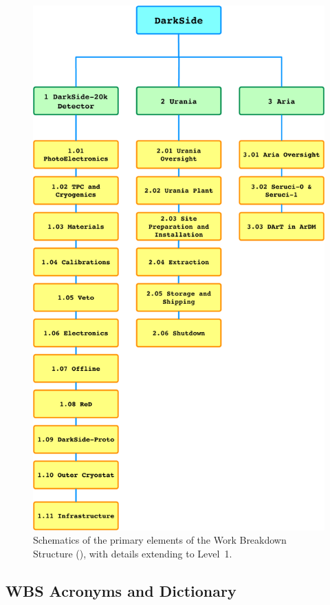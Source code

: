 \begin{figure} [!t]
\includegraphics[height=\textheight]{./Figures/WBS.pdf}
\caption[Schematics of Work Breakdown Structure (\WBS)]{Schematics of the primary elements of the Work Breakdown Structure (\WBS), with details extending to Level~1.}
\label{fig:WBS} 
\end{figure} 


\subsection{WBS Acronyms and Dictionary}

